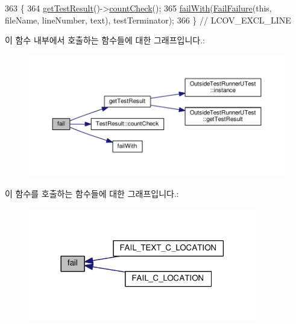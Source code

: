 \begin{DoxyCode}
363 \{
364     \hyperlink{class_utest_shell_a34c525b685e30431750d9e355fdfff0c}{getTestResult}()->\hyperlink{class_test_result_a58577489a2418efb4c440761e533f2e7}{countCheck}();
365     \hyperlink{class_utest_shell_ad50ae28f5ad9f1d224832cb1f89365a7}{failWith}(\hyperlink{class_fail_failure}{FailFailure}(\textcolor{keyword}{this}, fileName, lineNumber, text), testTerminator);
366 \} \textcolor{comment}{// LCOV\_EXCL\_LINE}
\end{DoxyCode}


이 함수 내부에서 호출하는 함수들에 대한 그래프입니다.\+:
\nopagebreak
\begin{figure}[H]
\begin{center}
\leavevmode
\includegraphics[width=350pt]{class_utest_shell_a551151a34264d19c3954dab0948ea186_cgraph}
\end{center}
\end{figure}




이 함수를 호출하는 함수들에 대한 그래프입니다.\+:
\nopagebreak
\begin{figure}[H]
\begin{center}
\leavevmode
\includegraphics[width=282pt]{class_utest_shell_a551151a34264d19c3954dab0948ea186_icgraph}
\end{center}
\end{figure}


